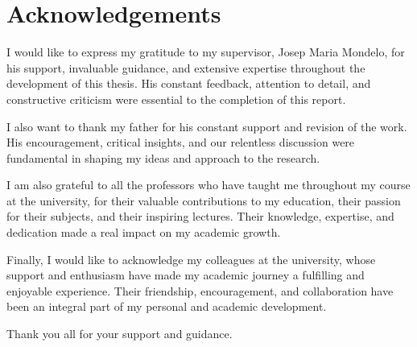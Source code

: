 \documentclass[../main.tex]{subfiles}
\begin{document}
\section*{Acknowledgements}
I would like to express my gratitude to my supervisor, Josep Maria Mondelo, for his support, invaluable guidance, and extensive expertise throughout the development of this thesis. His constant feedback, attention to detail, and constructive criticism were essential to the completion of this report.

I also want to thank my father for his constant support and revision of the work. His encouragement, critical insights, and our relentless discussion were fundamental in shaping my ideas and approach to the research.

I am also grateful to all the professors who have taught me throughout my course at the university, for their valuable contributions to my education, their passion for their subjects, and their inspiring lectures. Their knowledge, expertise, and dedication made a real impact on my academic growth.

Finally, I would like to acknowledge my colleagues at the university, whose support and enthusiasm have made my academic journey a fulfilling and enjoyable experience. Their friendship, encouragement, and collaboration have been an integral part of my personal and academic development.

Thank you all for your support and guidance.
\end{document}
